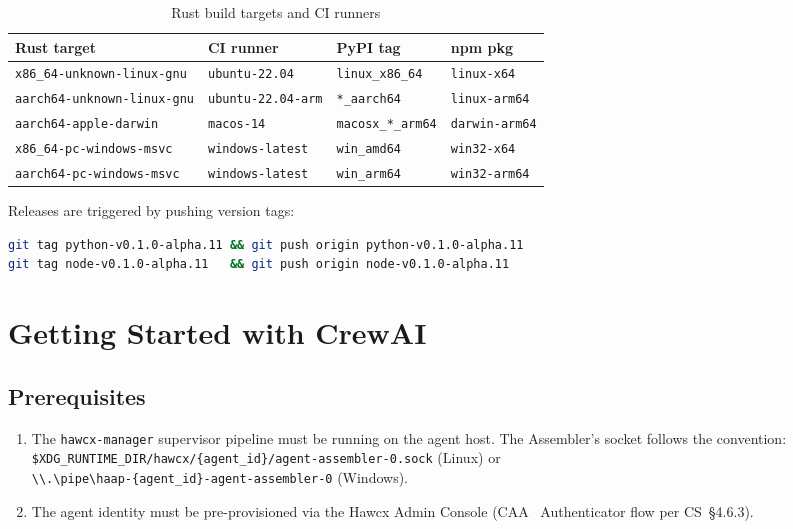 \documentclass[11pt, a4paper]{article}
\newcommand{\pkg}[1]{\texttt{#1}}
\newcommand{\code}[1]{\texttt{#1}}
\begin{document}
\begin{table}[h!]
\centering
\caption{Rust build targets and CI runners}
\renewcommand{\arraystretch}{1.25}
\begin{tabular}{@{} l l l l @{}}
\toprule
\textbf{Rust target} & \textbf{CI runner} & \textbf{PyPI tag} & \textbf{npm pkg} \\
\midrule
\code{x86\_64-unknown-linux-gnu}   & \code{ubuntu-22.04}     & \code{linux\_x86\_64}        & \code{linux-x64}    \\
\code{aarch64-unknown-linux-gnu}   & \code{ubuntu-22.04-arm} & \code{*\_aarch64}            & \code{linux-arm64}  \\
\code{aarch64-apple-darwin}        & \code{macos-14}         & \code{macosx\_*\_arm64}      & \code{darwin-arm64} \\
\code{x86\_64-pc-windows-msvc}     & \code{windows-latest}   & \code{win\_amd64}            & \code{win32-x64}    \\
\code{aarch64-pc-windows-msvc}     & \code{windows-latest}   & \code{win\_arm64}            & \code{win32-arm64}  \\
\bottomrule
\end{tabular}
\end{table}

Releases are triggered by pushing version tags:

\begin{lstlisting}[language=bash, numbers=none, frame=none, backgroundcolor=\color{codebg}]
git tag python-v0.1.0-alpha.11 && git push origin python-v0.1.0-alpha.11
git tag node-v0.1.0-alpha.11   && git push origin node-v0.1.0-alpha.11
\end{lstlisting}

\section{Getting Started with CrewAI}

\subsection{Prerequisites}

\begin{enumerate}
  \item The \pkg{hawcx-manager} supervisor pipeline must be running on the
        agent host. The Assembler's socket follows the convention:\\
        \code{\$XDG\_RUNTIME\_DIR/hawcx/\{agent\_id\}/agent-assembler-0.sock}
        (Linux) or\\
        \code{\textbackslash\textbackslash.\textbackslash pipe\textbackslash haap-\{agent\_id\}-agent-assembler-0}
        (Windows).
  \item The agent identity must be pre-provisioned via the Hawcx Admin Console
        (CAA \textrightarrow\ Authenticator flow per CS~§4.6.3).
\end{enumerate}
\end{document}
